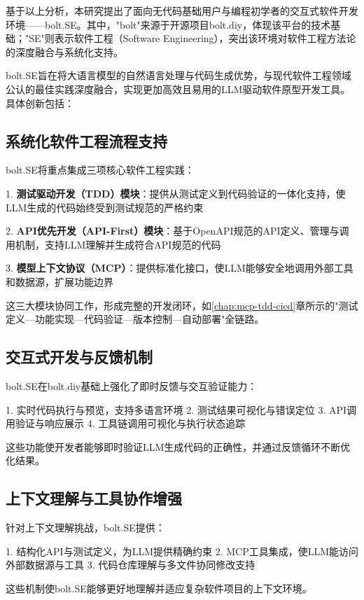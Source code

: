 基于以上分析，本研究提出了面向无代码基础用户与编程初学者的交互式软件开发环境——bolt.SE。其中，"bolt"来源于开源项目bolt.diy，体现该平台的技术基础；"SE"则表示软件工程（Software Engineering），突出该环境对软件工程方法论的深度融合与系统化支持。

bolt.SE旨在将大语言模型的自然语言处理与代码生成优势，与现代软件工程领域公认的最佳实践深度融合，实现更加高效且易用的LLM驱动软件原型开发工具。具体创新包括：

\subsection{系统化软件工程流程支持}

bolt.SE将重点集成三项核心软件工程实践：

1. \textbf{测试驱动开发（TDD）模块}：提供从测试定义到代码验证的一体化支持，使LLM生成的代码始终受到测试规范的严格约束
   
2. \textbf{API优先开发（API-First）模块}：基于OpenAPI规范的API定义、管理与调用机制，支持LLM理解并生成符合API规范的代码

3. \textbf{模型上下文协议（MCP）}：提供标准化接口，使LLM能够安全地调用外部工具和数据源，扩展功能边界

这三大模块协同工作，形成完整的开发闭环，如\ref{chap:mcp-tdd-cicd}章所示的"测试定义—功能实现—代码验证—版本控制—自动部署"全链路。

\subsection{交互式开发与反馈机制}

bolt.SE在bolt.diy基础上强化了即时反馈与交互验证能力：

1. 实时代码执行与预览，支持多语言环境
2. 测试结果可视化与错误定位
3. API调用验证与响应展示
4. 工具链调用可视化与执行状态追踪

这些功能使开发者能够即时验证LLM生成代码的正确性，并通过反馈循环不断优化结果。

\subsection{上下文理解与工具协作增强}

针对上下文理解挑战，bolt.SE提供：

1. 结构化API与测试定义，为LLM提供精确约束
2. MCP工具集成，使LLM能访问外部数据源与工具
3. 代码仓库理解与多文件协同修改支持

这些机制使bolt.SE能够更好地理解并适应复杂软件项目的上下文环境。

